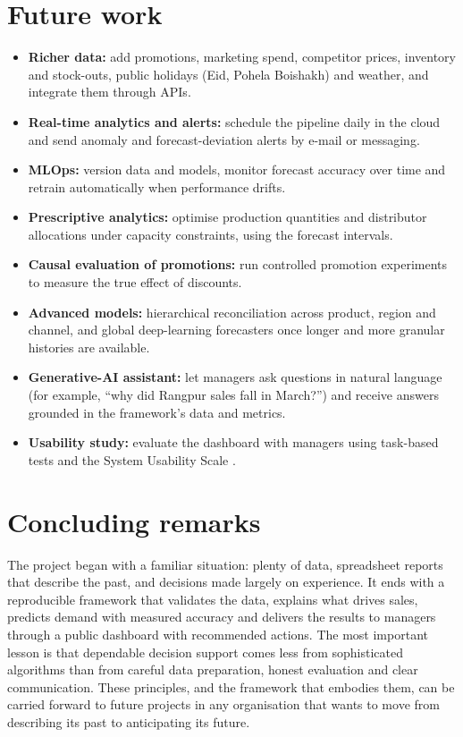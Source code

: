 \section{Future work}
\begin{itemize}
  \item \textbf{Richer data:} add promotions, marketing spend, competitor prices, inventory and stock-outs,
        public holidays (Eid, Pohela Boishakh) and weather, and integrate them through APIs.
  \item \textbf{Real-time analytics and alerts:} schedule the pipeline daily in the cloud and send anomaly and
        forecast-deviation alerts by e-mail or messaging.
  \item \textbf{MLOps:} version data and models, monitor forecast accuracy over time and retrain automatically
        when performance drifts.
  \item \textbf{Prescriptive analytics:} optimise production quantities and distributor allocations under
        capacity constraints, using the forecast intervals.
  \item \textbf{Causal evaluation of promotions:} run controlled promotion experiments to measure the true
        effect of discounts.
  \item \textbf{Advanced models:} hierarchical reconciliation across product, region and channel, and global
        deep-learning forecasters once longer and more granular histories are available.
  \item \textbf{Generative-AI assistant:} let managers ask questions in natural language (for example,
        ``why did Rangpur sales fall in March?'') and receive answers grounded in the framework's data and metrics.
  \item \textbf{Usability study:} evaluate the dashboard with managers using task-based tests and the System
        Usability Scale \citep{brooke1996}.
\end{itemize}

\section{Concluding remarks}
The project began with a familiar situation: plenty of data, spreadsheet reports that describe the past, and
decisions made largely on experience. It ends with a reproducible framework that validates the data, explains
what drives sales, predicts demand with measured accuracy and delivers the results to managers through a
public dashboard with recommended actions. The most important lesson is that dependable decision support comes
less from sophisticated algorithms than from careful data preparation, honest evaluation and clear
communication. These principles, and the framework that embodies them, can be carried forward to future
projects in any organisation that wants to move from describing its past to anticipating its future.
